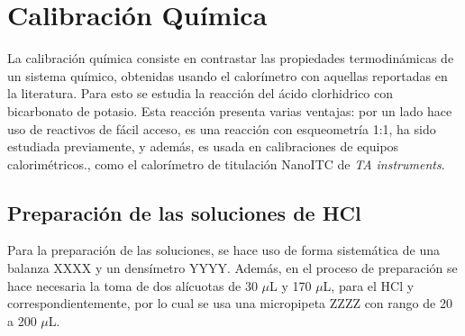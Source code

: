 
%




\chapter{Calibraci\'on Qu\'imica}
	La calibraci\'on qu\'imica consiste en contrastar las propiedades termodin\'amicas de un sistema qu\'imico, obtenidas usando el calor\'imetro con aquellas reportadas en la literatura. Para esto se estudia la reacci\'on del \'acido clorhidrico con bicarbonato de potasio. Esta reacci\'on presenta varias ventajas: por un lado hace uso de reactivos de f\'acil acceso, es una reacci\'on con esqueometr\'ia 1:1, ha sido estudiada previamente, y adem\'as, es usada en calibraciones de equipos calorim\'etricos., como el calor\'imetro de titulaci\'on NanoITC de \textit{TA instruments}.
	
\section{Preparaci\'on de las soluciones de HCl}
	Para la preparaci\'on de las soluciones, se hace uso de forma sistem\'atica de una balanza XXXX y un dens\'imetro YYYY. Adem\'as, en el proceso de preparaci\'on se hace necesaria la toma de dos al\'icuotas de 30 $\mu$L y 170 $\mu$L, para el HCl y  correspondientemente, por lo cual se usa una micropipeta ZZZZ con rango de 20 a 200 $\mu$L.
